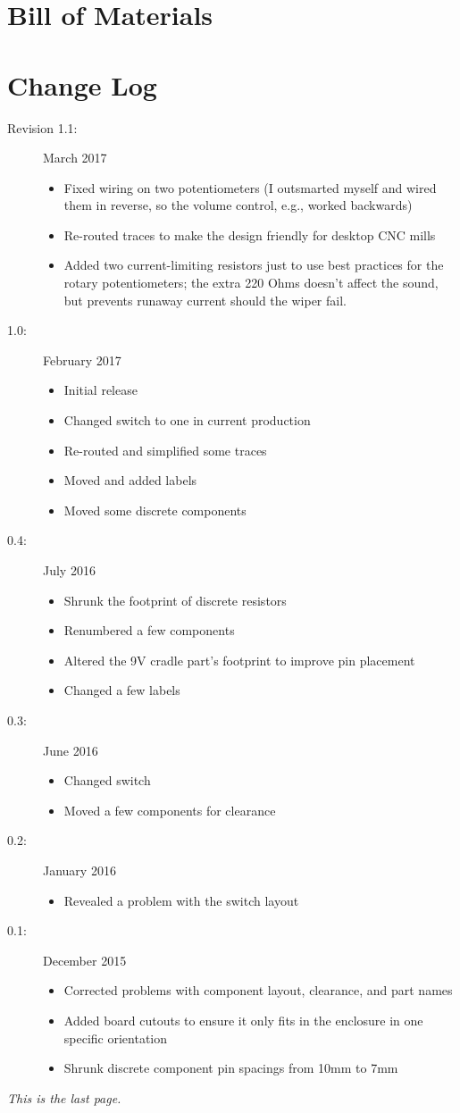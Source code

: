 \documentclass[12pt]{article}
\newcommand{\+}{\item}		%
\newcommand{\bi}{\begin{itemize}}
\newcommand{\ei}{\end{itemize}}
\newcommand{\bd}{\begin{description}}
\newcommand{\ed}{\end{description}}
\newcommand{\revision}{1.1}
\begin{document}
\clearpage
\newpage

\else
	\newpage
\fi


\begin{table}
\section*{Bill of Materials}

\end{table}

\clearpage

\section{Change Log}

\bd

\+[Revision \revision{}:] March 2017
\bi
\+ Fixed wiring on two potentiometers (I outsmarted myself and wired them in reverse, so the volume control, e.g., worked backwards)
\+ Re-routed traces to make the design friendly for desktop CNC mills
\+ Added two current-limiting resistors just to use best practices for the rotary potentiometers; the extra 220 Ohms doesn't affect the sound, but prevents runaway current should the wiper fail.
\ei

\+[1.0:] February 2017
\bi
\+ Initial release
\+ Changed switch to one in current production
\+ Re-routed and simplified some traces
\+ Moved and added labels
\+ Moved some discrete components
\ei


\+[0.4:] July 2016
\bi
\+ Shrunk the footprint of discrete resistors
\+ Renumbered a few components
\+ Altered the 9V cradle part's footprint to improve pin placement
\+ Changed a few labels
\ei

\+[0.3:] June 2016
\bi
\+ Changed switch
\+ Moved a few components for clearance
\ei


\+[0.2:] January 2016
\bi
\+ Revealed a problem with the switch layout
\ei

\+[0.1:] December 2015
\bi
\+ Corrected problems with component layout, clearance, and part names
\+ Added board cutouts to ensure it only fits in the enclosure in one specific orientation
\+ Shrunk discrete component pin spacings from 10mm to 7mm
\ei
\ed

\vfill

\begin{center}
\emph{This is the last page.}
\end{center}
\end{document}
